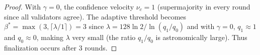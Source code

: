 \begin{proof}
With $\gamma = 0$, the confidence velocity $\nu_c = 1$ (supermajority in every round
since all validators agree). The adaptive threshold becomes $\beta^* = \max(3, \lceil \lambda / 1 \rceil) = 3$
since $\lambda = 128 \ln 2 / \ln(q_1/q_0)$ and with $\gamma = 0$, $q_1 \approx 1$ and
$q_0 \approx 0$, making $\lambda$ very small (the ratio $q_1/q_0$ is astronomically large).
Thus finalization occurs after 3 rounds.
\end{proof}

